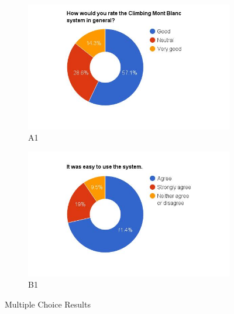 \begin{figure}
    \begin{subfigure}[h]{0.48\textwidth}
        \centerline{\includegraphics[width=1.5\textwidth]{results/general_cmb.jpg}}
        \caption{A1}
        \label{fig:cmb-general}
    \end{subfigure}
    \hfill
    \begin{subfigure}[h]{0.48\textwidth}
        \centerline{\includegraphics[width=1.5\textwidth]{results/easy_to_use.jpg}}
        \caption{B1}
        \label{fig:cmb-easy-use}
    \end{subfigure}
    \caption{Multiple Choice Results}
    \label{fig:multiplechoice}
\end{figure}


